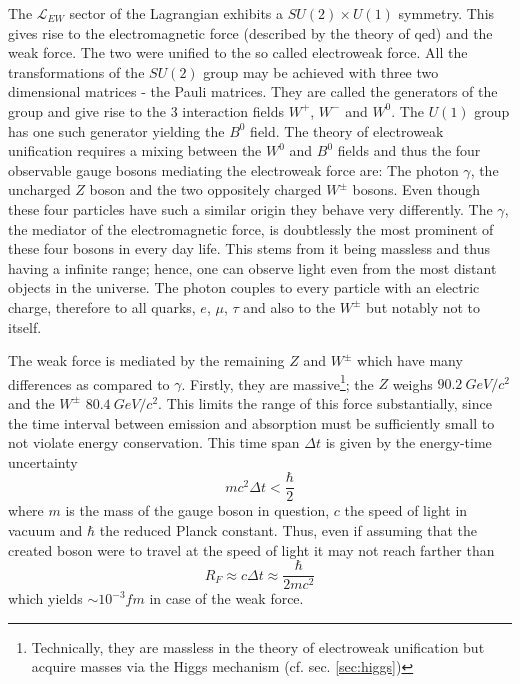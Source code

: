 The $\mathcal{L}_{EW}$ sector of the Lagrangian exhibits a $SU(2) \times U(1)$ symmetry. This gives rise to the electromagnetic force (described by the theory of \gls{qed}) and the weak force. The two were unified to the so called electroweak force. All the transformations of the $SU(2)$ group may be achieved with three two dimensional matrices - the Pauli matrices. They are called the generators of the group and give rise to the 3 interaction fields $W^+$, $W^-$ and $W^0$. The $U(1)$ group has one such generator yielding the $B^0$ field. The theory of electroweak unification requires a mixing between the $W^0$ and $B^0$ fields and thus the four observable gauge bosons mediating the electroweak force are: The photon $\gamma$, the uncharged $Z$ boson and the two oppositely charged $W^\pm$ bosons. Even though these four particles have such a similar origin they behave very differently. The $\gamma$, the mediator of the electromagnetic force, is doubtlessly the most prominent of these four bosons in every day life. This stems from it being massless and thus having a infinite range; hence, one can observe light even from the most distant objects in the universe. The photon couples to every particle with an electric charge, therefore to all quarks, $e$, $\mu$, $\tau$ and also to the $W^\pm$ but notably not to itself. 

The weak force is mediated by the remaining $Z$ and $W^\pm$ which have many differences as compared to $\gamma$. Firstly, they are massive\footnote{Technically, they are massless in the theory of electroweak unification but acquire masses via the Higgs mechanism (cf. sec. \ref{sec:higgs})}; the $Z$ weighs $\SI{90.2}{GeV/c^2}$ and the $W^\pm$ $\SI{80.4}{GeV/c^2}$. This limits the range of this force substantially, since the time interval between emission and absorption must be sufficiently small to not violate energy conservation. This time span $\Delta t$ is given by the energy-time uncertainty
\begin{equation}
  \label{eq:energy-time-uncertainty}
  mc^2\Delta t < \frac{\hbar}{2}
\end{equation}
where $m$ is the mass of the gauge boson in question, $c$ the speed of light in vacuum and $\hbar$ the reduced Planck constant. Thus, even if assuming that the created boson were to travel at the speed of light it may not reach farther than
\begin{equation}
  R_F \approx c\Delta t \approx \frac{\hbar}{2mc^2}
\end{equation}
which yields $\sim 10^{-3}\si{fm}$ in case of the weak force.

